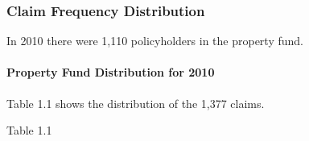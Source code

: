 \documentclass[]{book}
\newenvironment{Shaded}{\begin{snugshade}}{\end{snugshade}}
\newcommand{\KeywordTok}[1]{\textcolor[rgb]{0.13,0.29,0.53}{\textbf{#1}}}
\newcommand{\DecValTok}[1]{\textcolor[rgb]{0.00,0.00,0.81}{#1}}
\newcommand{\StringTok}[1]{\textcolor[rgb]{0.31,0.60,0.02}{#1}}
\newcommand{\OperatorTok}[1]{\textcolor[rgb]{0.81,0.36,0.00}{\textbf{#1}}}
\newcommand{\NormalTok}[1]{#1}
\let\oldparagraph\paragraph
\renewcommand{\paragraph}[1]{\oldparagraph{#1}\mbox{}}
\theoremstyle{definition}
\theoremstyle{definition}
\theoremstyle{definition}
\theoremstyle{remark}
\begin{document}
\subsubsection{Claim Frequency
Distribution}\label{claim-frequency-distribution}

In 2010 there were 1,110 policyholders in the property fund.

\paragraph{Property Fund Distribution for
2010}\label{property-fund-distribution-for-2010}

Table 1.1 shows the distribution of the 1,377 claims.

Table 1.1

\begin{Shaded}
\end{Shaded}
\end{document}
